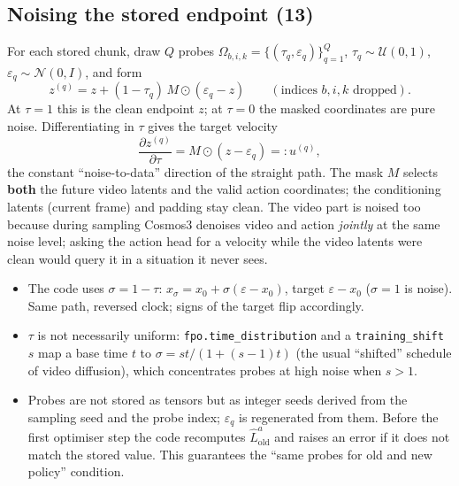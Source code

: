 \documentclass[11pt,a4paper]{article}
\newcommand{\Lh}{\hat L^{a}}
\newcommand{\eqp}[1]{\textup{(#1)}} %
\theoremstyle{remark}
\begin{document}
\subsection{Noising the stored endpoint \eqp{13}}
For each stored chunk, draw $Q$ probes $\Omega_{b,i,k}=\{(\tau_q,\varepsilon_q)\}_{q=1}^Q$, $\tau_q\sim\mathcal U(0,1)$, $\varepsilon_q\sim\mathcal N(0,I)$, and form
\begin{equation}
z^{(q)}=z+(1-\tau_q)\,M\odot(\varepsilon_q-z)\qquad(\text{indices }b,i,k\text{ dropped}).
\label{eq:noise}
\end{equation}
At $\tau=1$ this is the clean endpoint $z$; at $\tau=0$ the masked coordinates are pure noise. Differentiating in $\tau$ gives the target velocity
\begin{equation}
\frac{\partial z^{(q)}}{\partial\tau}=M\odot(z-\varepsilon_q)=:u^{(q)},
\label{eq:target}
\end{equation}
the constant ``noise-to-data'' direction of the straight path. The mask $M$ selects \textbf{both} the future video latents and the valid action coordinates; the conditioning latents (current frame) and padding stay clean. The video part is noised too because during sampling Cosmos3 denoises video and action \emph{jointly} at the same noise level; asking the action head for a velocity while the video latents were clean would query it in a situation it never sees.

\begin{codenote}
\begin{itemize}[leftmargin=*]
\item The code uses $\sigma=1-\tau$: $x_\sigma=x_0+\sigma(\varepsilon-x_0)$, target $\varepsilon-x_0$ ($\sigma=1$ is noise). Same path, reversed clock; signs of the target flip accordingly.
\item $\tau$ is not necessarily uniform: \texttt{fpo.time\_distribution} and a \texttt{training\_shift} $s$ map a base time $t$ to $\sigma=st/(1+(s-1)t)$ (the usual ``shifted'' schedule of video diffusion), which concentrates probes at high noise when $s>1$.
\item Probes are not stored as tensors but as integer seeds derived from the sampling seed and the probe index; $\varepsilon_q$ is regenerated from them. Before the first optimiser step the code recomputes $\Lh_{\mathrm{old}}$ and raises an error if it does not match the stored value. This guarantees the ``same probes for old and new policy'' condition.
\end{itemize}
\end{codenote}
\end{document}
